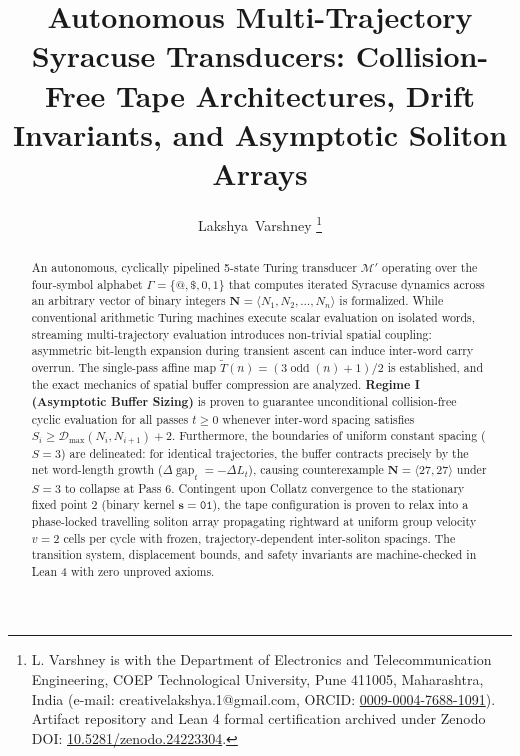 \documentclass[journal,10pt,twocolumn]{IEEEtran}
\DeclareMathOperator{\gap}{gap}
\DeclareMathOperator{\oddcore}{odd}
\begin{document}
\title{Autonomous Multi-Trajectory Syracuse Transducers: Collision-Free Tape Architectures, Drift Invariants, and Asymptotic Soliton Arrays}

\author{Lakshya~Varshney\hspace{0.55em}\hspace{0.45em}\href{mailto:creativelakshya.1@gmail.com}{\raisebox{0.05ex}{\scalebox{0.75}{\color{black!50}\faEnvelope}}}%
\thanks{L. Varshney is with the Department of Electronics and Telecommunication Engineering, COEP Technological University, Pune 411005, Maharashtra, India (e-mail: creativelakshya.1@gmail.com, ORCID: \href{https://orcid.org/0009-0004-7688-1091}{0009-0004-7688-1091}). Artifact repository and Lean 4 formal certification archived under Zenodo DOI: \href{https://doi.org/10.5281/zenodo.24223304}{10.5281/zenodo.24223304}.}}

\maketitle

\begin{abstract}
An autonomous, cyclically pipelined 5-state Turing transducer $\mathcal{M}'$ operating over the four-symbol alphabet $\Gamma = \{@, \$, 0, 1\}$ that computes iterated Syracuse dynamics across an arbitrary vector of binary integers $\mathbf{N} = \langle N_1, N_2, \dots, N_n \rangle$ is formalized. While conventional arithmetic Turing machines execute scalar evaluation on isolated words, streaming multi-trajectory evaluation introduces non-trivial spatial coupling: asymmetric bit-length expansion during transient ascent can induce inter-word carry overrun. The single-pass affine map $\widetilde{T}(n) = (3\oddcore(n)+1)/2$ is established, and the exact mechanics of spatial buffer compression are analyzed. \textbf{Regime I (Asymptotic Buffer Sizing)} is proven to guarantee unconditional collision-free cyclic evaluation for all passes $t \ge 0$ whenever inter-word spacing satisfies $S_i \ge \mathcal{D}_{\max}(N_i, N_{i+1}) + 2$. Furthermore, the boundaries of uniform constant spacing ($S = 3$) are delineated: for identical trajectories, the buffer contracts precisely by the net word-length growth ($\Delta\gap_t = -\Delta L_t$), causing counterexample $\mathbf{N} = \langle 27, 27 \rangle$ under $S = 3$ to collapse at Pass 6. Contingent upon Collatz convergence to the stationary fixed point $2$ (binary kernel $\mathbf{s} = \texttt{01}$), the tape configuration is proven to relax into a phase-locked travelling soliton array propagating rightward at uniform group velocity $v = 2$ cells per cycle with frozen, trajectory-dependent inter-soliton spacings. The transition system, displacement bounds, and safety invariants are machine-checked in Lean 4 with zero unproved axioms.
\end{abstract}
\end{document}
